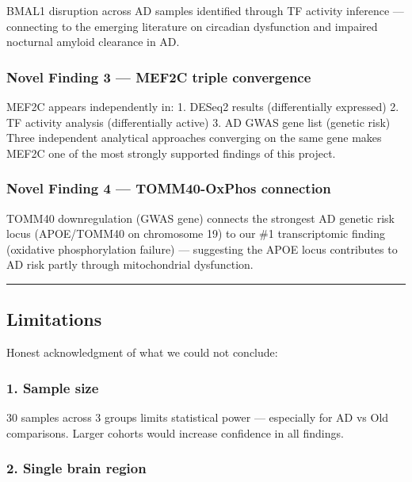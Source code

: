 \documentclass[
]{article}
\begin{document}
BMAL1 disruption across AD samples identified through TF activity
inference --- connecting to the emerging literature on circadian
dysfunction and impaired nocturnal amyloid clearance in AD.

\subsubsection{Novel Finding 3 --- MEF2C triple
convergence}\label{novel-finding-3-mef2c-triple-convergence}

MEF2C appears independently in: 1. DESeq2 results (differentially
expressed) 2. TF activity analysis (differentially active) 3. AD GWAS
gene list (genetic risk) Three independent analytical approaches
converging on the same gene makes MEF2C one of the most strongly
supported findings of this project.

\subsubsection{Novel Finding 4 --- TOMM40-OxPhos
connection}\label{novel-finding-4-tomm40-oxphos-connection}

TOMM40 downregulation (GWAS gene) connects the strongest AD genetic risk
locus (APOE/TOMM40 on chromosome 19) to our \#1 transcriptomic finding
(oxidative phosphorylation failure) --- suggesting the APOE locus
contributes to AD risk partly through mitochondrial dysfunction.

\begin{center}\rule{0.5\linewidth}{0.5pt}\end{center}

\subsection{Limitations}\label{limitations}

Honest acknowledgment of what we could not conclude:

\subsubsection{1. Sample size}\label{sample-size}

30 samples across 3 groups limits statistical power --- especially for
AD vs Old comparisons. Larger cohorts would increase confidence in all
findings.

\subsubsection{2. Single brain region}\label{single-brain-region}
\end{document}
